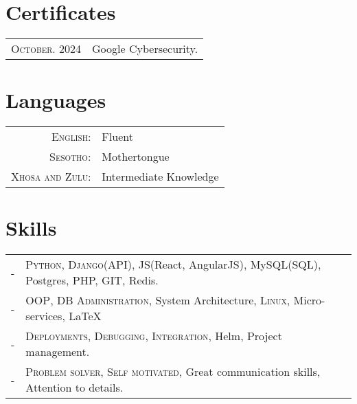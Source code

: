 \documentclass[a4paper,10pt]{article} %
\begin{document}

\section{Certificates}

\begin{tabular}{rl}
\textsc{October.} 2024 & Google Cybersecurity.\\
\end{tabular}


\section{Languages}

\begin{tabular}{rl}
\textsc{English:} & Fluent\\
\textsc{Sesotho:} & Mothertongue\\
\textsc{Xhosa and Zulu:} & Intermediate Knowledge\\
\end{tabular}


\section{Skills}

\begin{tabular}{rl}
- & \textsc{Python, Django(API)}, JS(React, AngularJS), MySQL(SQL), Postgres, PHP, GIT, Redis.\\

- & \textsc{OOP}, \textsc{DB Administration}, System Architecture, \textsc{Linux}, Micro-services, {\sffamily\LaTeX}\setmainfont[SmallCapsFont=Fontin SmallCaps]{Fontin-Regular}\\

- & \textsc{Deployments, Debugging, Integration}, Helm, Project management.\\

- & \textsc{Problem solver, Self motivated}, Great communication skills, Attention to details.\\
\end{tabular}
\end{document}
